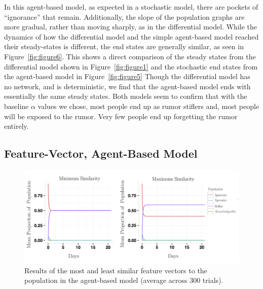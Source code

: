 In this agent-based model, as expected in a stochastic model, there are pockets of ``ignorance'' that remain.
Additionally, the slope of the population graphs are more gradual, rather than moving sharply, as in the differential model.
While the dynamics of how the differential model and the simple agent-based model reached their steady-states is different, the end states are generally similar, as seen in Figure~\ref{fig:figure6}.
This shows a direct comparison of the steady states from the differential model shown in Figure~\ref{fig:figure1} and the stochastic end states from the agent-based model in Figure~\ref{fig:figure5} Though the differential model has no network, and is deterministic, we find that the agent-based model ends with essentially the same steady states.
Both models seem to confirm that with the baseline $\alpha$ values we chose, most people end up as rumor stiflers and, most people will be exposed to the rumor.
Very few people end up forgetting the rumor entirely.

\subsection{Feature-Vector, Agent-Based Model}
\label{subsec:featvect}

\begin{figure}[H]
\captionsetup{width=0.8\textwidth}
\centering
    \includegraphics[width=1\textwidth]{figures/figure7}
  \caption{ Results of the most and least similar feature vectors to the population in the agent-based model (average across $ 300 $ trials).}
\label{fig:figure7}
\end{figure}

